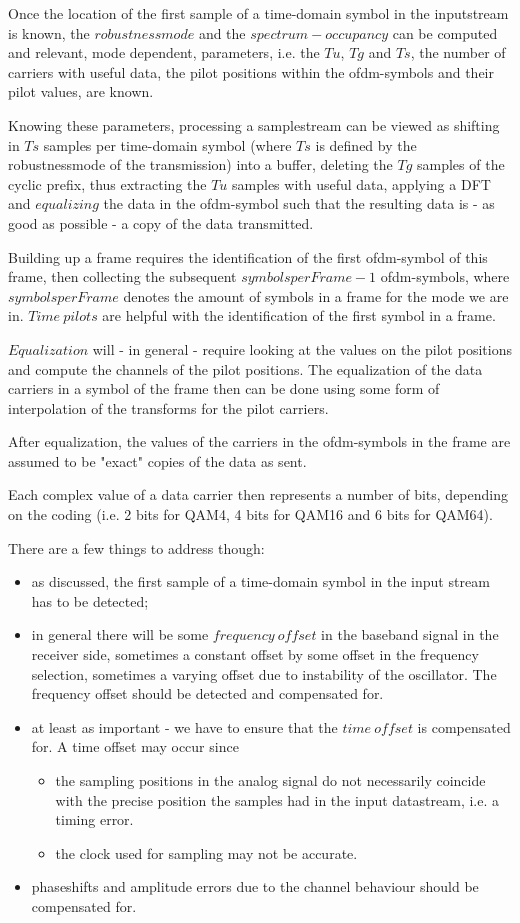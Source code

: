 \documentclass[11pt]{article}
\begin{document}
Once the location of the first sample of a time-domain symbol in the
inputstream is known, the $robustnessmode$ and the
$spectrum-occupancy$ can be computed and
relevant, mode dependent, parameters, i.e.
the $Tu$, $Tg$ and $Ts$, the number of carriers with useful data,
the pilot positions within
the ofdm-symbols and their pilot values, are known.

Knowing these parameters, processing a samplestream can be viewed
as shifting in $Ts$ samples per time-domain symbol (where $Ts$ is defined
by the robustnessmode of the transmission) into a buffer,
deleting the $Tg$ samples of the cyclic prefix, thus extracting
the $Tu$ samples with useful data, applying a DFT and
$equalizing$ the
data in the ofdm-symbol such that the resulting data is - as good as possible -
a copy of the data transmitted.

Building up a frame requires the identification of the first
ofdm-symbol of this frame,
then collecting the subsequent $symbolsperFrame - 1$
ofdm-symbols, where $symbolsperFrame$  denotes the amount of
symbols in a frame for the mode we are in.
$Time\ pilots$ are helpful with the identification of the first symbol
in a frame.

$Equalization$ will - in general -  require looking at
the values on the pilot positions 
and compute the channels of the pilot positions.
The equalization of the data carriers in a symbol of the frame
then can be done using some form of interpolation of the
transforms for the pilot carriers.

After equalization, the values of the carriers in the ofdm-symbols
in the frame are assumed to
be "exact" copies of the data as sent.

Each complex value of a data carrier then represents a number of bits, depending
on the coding (i.e. 2 bits for QAM4, 4 bits for QAM16 and 6 bits for QAM64).

There are a few things to address though:
\begin{itemize}
\item 
as discussed, the first sample of a time-domain symbol in the input stream
has to be detected;
\item
in general there will be some $frequency\ offset$ in the baseband signal in
the receiver side, sometimes a constant offset by some
offset in the frequency selection, sometimes a varying offset
due to instability of the
oscillator. The frequency offset should be detected and compensated for.
\item
at least as important - we have to ensure that the $time\ offset$ is
compensated for. A time offset  may occur since
\begin{itemize}
\item the  sampling positions  in the  analog signal
do not necessarily coincide with the precise position
the samples had in the
input datastream, i.e. a timing error.
\item the clock used for sampling may not be accurate.
\end{itemize}
\item phaseshifts and amplitude errors due to the channel behaviour
should be compensated for.
\end{itemize}
\end{document}
